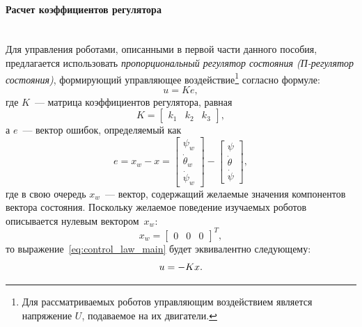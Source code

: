 \documentclass[12pt,a4paper,openany]{extarticle}
\begin{document}
\paragraph*{Расчет коэффициентов регулятора}$\phantom{-}$\\
\hspace*{\parindent}Для управления роботами, описанными в первой части данного пособия, предлагается использовать \textit{пропорциональный регулятор состояния (П-регулятор состояния)}, формирующий управляющее воздействие\footnote{Для рассматриваемых роботов управляющим воздействием является напряжение $U$, подаваемое на их двигатели.} согласно формуле:
\begin{equation}\label{eq:control_law_main}
u = Ke,
\end{equation}
где $K$~--- матрица коэффициентов регулятора, равная
\begin{equation}
K = 
\begin{bmatrix}
	k_1 & k_2 & k_3
\end{bmatrix}\!\!,
\end{equation}
а $e$~--- вектор ошибок, определяемый как
\begin{equation}
e = x_w-x = 
\begin{bmatrix}
\psi_w \\ \dot\theta_w \\ \dot\psi_w
\end{bmatrix}
-
\begin{bmatrix}
\psi \\ \dot\theta \\ \dot\psi
\end{bmatrix}\!\!,
\end{equation}
где в свою очередь $x_w$~--- вектор, содержащий желаемые значения компонентов вектора состояния.
Поскольку желаемое поведение изучаемых роботов описывается нулевым вектором~$x_w$:
\begin{equation}
x_w = 
\begin{bmatrix}
0 & 0 & 0
\end{bmatrix}^T\!\!\!\!,
\end{equation} 
то выражение~\eqref{eq:control_law_main} будет эквивалентно следующему:
\begin{equation}\label{eq:control_law_simple}
u = -Kx\ldotp
\end{equation}
\end{document}
